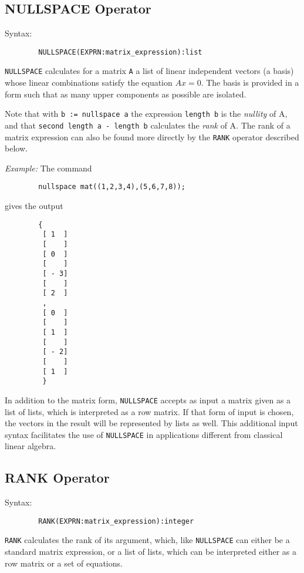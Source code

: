 \subsection{NULLSPACE Operator} 
Syntax:
\begin{verbatim}
        NULLSPACE(EXPRN:matrix_expression):list
\end{verbatim}
{\tt NULLSPACE} calculates for a matrix {\tt A} a list of linear
independent vectors (a basis) whose linear combinations satisfy the
equation $A x = 0$.  The basis is provided in a form such that as many
upper components as possible are isolated.

Note that with {\tt b := nullspace a} the expression {\tt length b} is the
{\em nullity} of A, and that {\tt second length a - length b} calculates the
{\em rank} of A.  The rank of a matrix expression can also be found more
directly by the {\tt RANK} operator described below.

{\it Example:} The command
\begin{verbatim}
        nullspace mat((1,2,3,4),(5,6,7,8));
\end{verbatim}
   gives the output
 
\begin{verbatim}
        {
         [ 1  ]
         [    ]
         [ 0  ]
         [    ]
         [ - 3]
         [    ]
         [ 2  ]
         ,
         [ 0  ]
         [    ]
         [ 1  ]
         [    ]
         [ - 2]
         [    ]
         [ 1  ]
         }
\end{verbatim}
 
In addition to the {\REDUCE} matrix form, {\tt NULLSPACE} accepts as input a
matrix given as a list of lists, which is interpreted as a row matrix.  If
that form of input is chosen, the vectors in the result will be
represented by lists as well.  This additional input syntax facilitates
the use of {\tt NULLSPACE} in applications different from classical linear
algebra.

\subsection{RANK Operator} 
 
Syntax:
\begin{verbatim}
        RANK(EXPRN:matrix_expression):integer
\end{verbatim}
{\tt RANK} calculates the rank of its argument, which, like {\tt NULLSPACE}
can either be a standard matrix expression, or a list of lists, which can
be interpreted either as a row matrix or a set of equations.

